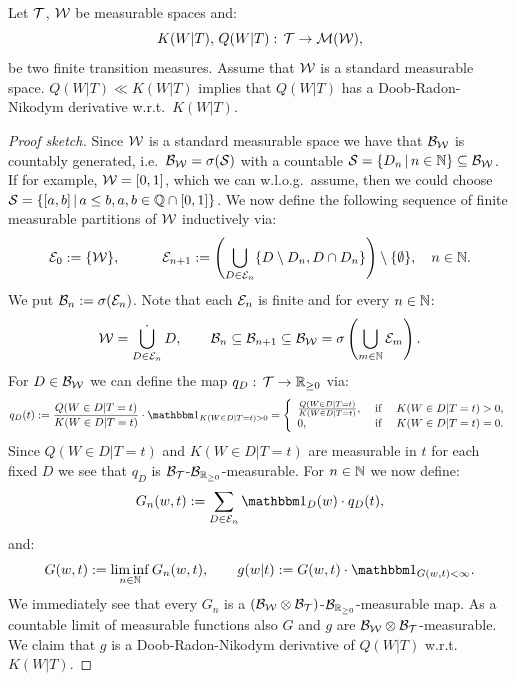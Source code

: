 \begin{Thm}
    Let $\mathcal{T}$, $\mathcal{W}$ be measurable spaces and:
    \[ K(W|T), \,Q(W|T):\, \mathcal{T} \to \mathcal{M}(\mathcal{W}),  \]
    be two finite transition measures. Assume that $\mathcal{W}$ is a standard measurable space.
    $Q(W|T) \ll K(W|T)$ implies that $Q(W|T)$ has a Doob-Radon-Nikodym derivative w.r.t.\ $K(W|T)$.
 \begin{proof}[Proof sketch]
    Since $\mathcal{W}$ is a standard measurable space we have that $\mathcal{B}_{\mathcal{W}}$ is countably generated, i.e.\
    $\mathcal{B}_{\mathcal{W}}=\sigma(\mathcal{S})$ with a countable $\mathcal{S}=\left \{  D_n \,\middle|\, n\in \mathbb{N} \right \} \subseteq \mathcal{B}_{\mathcal{W}}$. 
    If for example, $\mathcal{W}=[0,1]$, which we can w.l.o.g.\ assume, 
    then we could choose $\mathcal{S} =\left \{ [a,b] \,\middle|\, a \le b, a,b \in \mathbb{Q} \cap [0,1] \right \}$. 
    We now define the following sequence of finite measurable partitions of $\mathcal{W}$ inductively via:
     \[ \mathcal{E}_0:=\{\mathcal{W}\}, \qquad\quad \mathcal{E}_{n+1}:= \left(\bigcup_{D\in\mathcal{E}_{n}} \{ D \setminus D_n, D \cap D_n \} \right) \setminus \{\emptyset\}, \quad n \in \mathbb{N}. \]
     We put $\mathcal{B}_n:=\sigma(\mathcal{E}_n)$.
     Note that each $\mathcal{E}_n$ is finite and for every $n \in \mathbb{N}$:
     \[ \mathcal{W} = \mathop{\dot{\bigcup}}_{D \in \mathcal{E}_n} D, \qquad \mathcal{B}_n \subseteq \mathcal{B}_{n+1} \subseteq 
     \mathcal{B}_{\mathcal{W}} = \sigma \left ( \bigcup_{m \in \mathbb{N}} \mathcal{E}_m\right ).\]
     For $D \in \mathcal{B}_{\mathcal{W}}$ we can define the  map $q_D:\, \mathcal{T} \to \mathbb{R}_{\ge 0}$ via:
     \[ q_D(t):=  \frac{Q(W \in D|T=t)}{K(W \in D|T=t)}  \cdot 
     \I_{K(W \in D|T=t)>0}  = \left\{ 
    \begin{array}{lll}
        \frac{Q(W \in D|T=t)}{K(W \in D|T=t)},& \text{ if }& K(W \in D|T=t) > 0,\\
        0, & \text{ if }& K(W \in D|T=t) = 0.
    \end{array}
    \right. \]
    Since $Q(W\in D|T=t)$ and $K(W \in D|T=t)$ are measurable in $t$ for each fixed $D$ we see that $q_D$ is
    $\mathcal{B}_{\mathcal{T}}$-$\mathcal{B}_{\mathbb{R}_{\ge0}}$-measurable.
     For $n \in \mathbb{N}$ we now define:
     \[ G_n(w,t) := \sum_{D \in \Ecal_n}  \I_D(w) \cdot q_D(t), \]
     and:
     \[ G(w,t) := \liminf_{n\in\N} G_n(w,t), \qquad g(w|t):= G(w,t) \cdot \I_{G(w,t) < \infty}.\]
     We immediately see that every $G_n$ is a $(\mathcal{B}_{\mathcal{W}}\otimes\mathcal{B}_{\mathcal{T}})$-$\mathcal{B}_{\mathbb{R}_{\ge0}}$-measurable map. 
     As a countable limit of measurable functions also $G$ and $g$
     are $\mathcal{B}_{\mathcal{W}}\otimes\mathcal{B}_{\mathcal{T}}$-measurable. 
     We claim that $g$ is a Doob-Radon-Nikodym derivative of $Q(W|T)$ w.r.t.\ $K(W|T)$. 

\end{proof}
\end{Thm}
